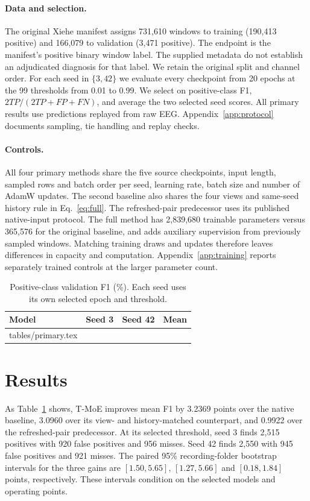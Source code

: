 \documentclass{article}
\newcommand{\tm}{T-MoE}
\begin{document}
\paragraph{Data and selection.}
The original Xiehe manifest assigns 731,610 windows to training (190,413 positive) and 166,079 to validation (3,471 positive). The endpoint is the manifest's positive binary window label. The supplied metadata do not establish an adjudicated diagnosis for that label. We retain the original split and channel order. For each seed in $\{3,42\}$ we evaluate every checkpoint from 20 epochs at the 99 thresholds from 0.01 to 0.99. We select on positive-class F1, $2TP/(2TP+FP+FN)$, and average the two selected seed scores. All primary results use predictions replayed from raw EEG. Appendix~\ref{app:protocol} documents sampling, tie handling and replay checks.

\paragraph{Controls.}
All four primary methods share the five source checkpoints, input length, sampled rows and batch order per seed, learning rate, batch size and number of AdamW updates. The second baseline also shares the four views and same-seed history rule in Eq.~\eqref{eq:full}. The refreshed-pair predecessor uses its published native-input protocol. The full method has 2,839,680 trainable parameters versus 365,576 for the original baseline, and adds auxiliary supervision from previously sampled windows. Matching training draws and updates therefore leaves differences in capacity and computation. Appendix~\ref{app:training} reports separately trained controls at the larger parameter count.

\begin{table}[t]
\caption{Positive-class validation F1 (\%). Each seed uses its own selected epoch and threshold.}\label{tab:primary}
\centering\small
\begin{tabular}{@{}lrrr@{}}
\toprule Model & Seed 3 & Seed 42 & Mean\\ \midrule
{} tables/primary.tex
\bottomrule
\end{tabular}
\end{table}

\section{Results}
As Table~\ref{tab:primary} shows, \tm{} improves mean F1 by 3.2369 points over the native baseline, 3.0960 over its view- and history-matched counterpart, and 0.9922 over the refreshed-pair predecessor. At its selected threshold, seed 3 finds 2,515 positives with 920 false positives and 956 misses. Seed 42 finds 2,550 with 945 false positives and 921 misses. The paired 95\% recording-folder bootstrap intervals for the three gains are $[1.50,5.65]$, $[1.27,5.66]$ and $[0.18,1.84]$ points, respectively. These intervals condition on the selected models and operating points.
\end{document}
